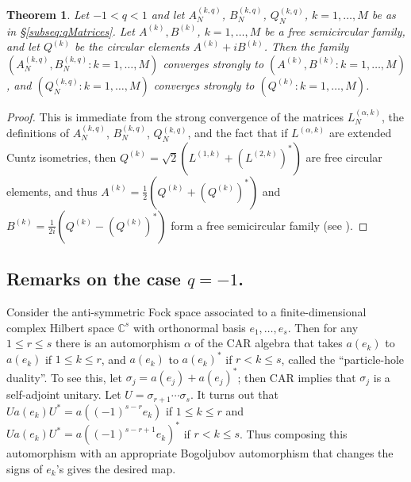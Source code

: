 \documentclass[11pt]{article}
\newtheorem{theorem}{Theorem}
\begin{document}
      \begin{theorem}
          Let $-1<q<1$ and let  $A_N^{(k,q)}$, $B_N^{(k,q)}$, $Q_N^{(k,q)}$, $k=1,\dots,M$ be as in \S\ref{subseq:qMatrices}.  Let $A^{(k)}, B^{(k)}$, $k=1,\dots,M$ be a free semicircular family, and let $Q^{(k)}$ be the circular elements $A^{(k)} + i B^{(k)}$.  Then the family $(A_N^{(k,q)}, B_N^{(k,q)}: k=1,\dots,M)$ converges strongly to $(A^{(k)}, B^{(k)} : k=1,\dots,M)$, and $(Q^{(k,q)}_N:k=1,\dots,M)$ converges strongly to $(Q^{(k)}:k=1,\dots,M)$.
    \end{theorem}
    \begin{proof}
        This is immediate from the strong convergence of the matrices $L_{N}^{(\alpha,k)}$, the definitions of $A_N^{(k,q)}$, $B_N^{(k,q)}$, 
        $Q_N^{(k,q)}$, and the fact that if $L^{(\alpha,k)}$ are extended Cuntz 
        isometries, then $Q^{(k)} = \sqrt{2}(L^{(1,k)} + (L^{(2,k)})^*)$ are free circular 
        elements, and thus $A^{(k)} = \frac{1}{2} (Q^{(k)} + (Q^{(k)})^*)$ and 
        $B^{(k)} = \frac{1}{2i} (Q^{(k)} - (Q^{(k)})^*)$ form a free semicircular family (see \cite{Voiculescu:Symmetries,Voiculescu:Circular}).
    \end{proof}
    
\subsection{Remarks on the case $q=-1$.} 
Consider the anti-symmetric Fock space associated to a finite-dimensional complex Hilbert space $\mathbb{C}^s$ with orthonormal basis $e_1,\dots,e_s$. Then for any $1\leq r\leq s$ there is an automorphism $\alpha$ of the CAR algebra that takes $a(e_k)$ to $a(e_k)$ if $1\leq k\leq r$, and $a(e_k)$ to $a(e_k)^*$ if $r< k\leq s$, called the ``particle-hole duality''.  To see this, let $\sigma_j = a(e_j)+a(e_j)^*$; then CAR implies that $\sigma_j$ is a self-adjoint unitary.  Let $U=\sigma_{r+1}\cdots \sigma_{s}$. It turns out that $U a(e_k) U^* = a((-1)^{s-r}e_k)$ if $1\leq k\leq r$ and $U a(e_k)U^* = a((-1)^{s-r+1}e_k)^*$ if $r<k\leq s$.  Thus composing this  automorphism with an appropriate Bogoljubov automorphism that changes the signs of $e_k$'s gives the desired map.  
\end{document}
